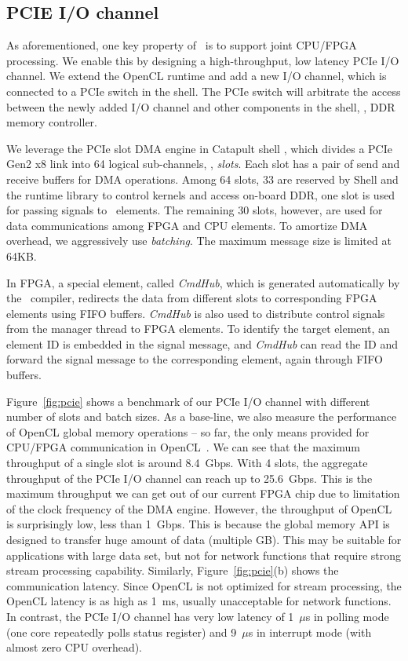 \subsection{PCIE I/O channel}
\label{subsec:pcie}

As aforementioned, one key property of \name\ is to support joint CPU/FPGA processing. 
We enable this by designing a high-throughput, low latency PCIe I/O channel. 
%
We extend the OpenCL runtime and add a new I/O channel, which is connected to 
a PCIe switch in the shell. 
The PCIe switch will arbitrate the access between the newly added I/O channel
and other components in the shell, \eg, DDR memory controller.

We leverage the PCIe slot DMA engine in Catapult shell \cite{putnam2014reconfigurable}, which divides a PCIe Gen2 x8 link into 64 logical sub-channels, \ie, \textit{slots}.
Each slot has a pair of send and receive buffers for DMA operations.
%
Among 64 slots, 33 are reserved by Shell and the runtime library to control kernels and access on-board DDR, one slot is used for passing signals to \name\ elements. 
The remaining 30 slots, however, are used for data communications among FPGA and CPU elements.
%
To amortize DMA overhead, we aggressively use \textit{batching}. The maximum message size 
is limited at 64KB. 



In FPGA, a special element, called \textit{CmdHub}, which is generated automatically by the \name\ compiler, 
redirects the data from different slots to corresponding FPGA elements 
using FIFO buffers.
\textit{CmdHub} is also used to distribute control signals from the manager 
thread to FPGA elements.
To identify the target element, an element ID is embedded in the signal message,
and \textit{CmdHub} can read the ID and forward the signal message to 
the corresponding element, again through FIFO buffers. 

Figure~\ref{fig:pcie} shows a benchmark of our PCIe I/O channel with different number of slots and batch sizes.
As a base-line, we also measure the performance of OpenCL global memory operations -- so far, the only means provided
for CPU/FPGA communication in OpenCL~\cite{opencl}. 
%
We can see that the maximum throughput of a single slot is around 8.4~Gbps. 
With 4 slots, the aggregate throughput of the PCIe I/O channel can reach up to 25.6~Gbps. 
This is the maximum throughput we can get out of our current FPGA chip due to limitation of the clock frequency of the DMA engine. 
However, the throughput of OpenCL is surprisingly low, less than 1~Gbps. This is because the global memory API is designed
to transfer huge amount of data (multiple GB). This may be suitable for applications with large data set, but not for 
network functions that require strong stream processing capability.
Similarly, Figure~\ref{fig:pcie}(b) shows the communication latency. Since OpenCL is not optimized for stream processing,
the OpenCL latency is as high as 1~ms, usually unacceptable for network functions. 
In contrast, the PCIe I/O channel has very low latency of 1~$\mu$s in polling mode (one core repeatedly polls status register) and 9~$\mu$s in interrupt mode (with almost zero CPU overhead).

